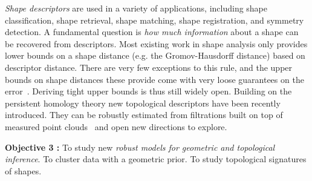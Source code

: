 {\em Shape descriptors} are used in a variety of applications, including shape classification, shape retrieval, shape matching, shape registration, and symmetry detection.  %
A fundamental question is {\em how much information} about a shape can be recovered from descriptors. Most existing work in shape analysis only provides lower bounds on a shape distance (e.g. the Gromov-Hausdorff distance) based on descriptor distance. There are very few exceptions to this rule, and the upper bounds on shape distances these provide come with very loose guarantees on the error~\cite{bbk-gmds-06,ms-gh-05}. Deriving tight upper bounds is thus still widely open. 
Building on the persistent homology theory new topological descriptors have been recently introduced. They can be robustly estimated from filtrations built on top of measured point clouds~\cite{ccgmo-ghsssp-09, socg-pbsds-10}  and open new directions to explore.



\vspace{2mm}

{\bf Objective 3 :} To study new {\em robust models for geometric and topological inference}.  To cluster data with a geometric prior. To study topological signatures of shapes.

